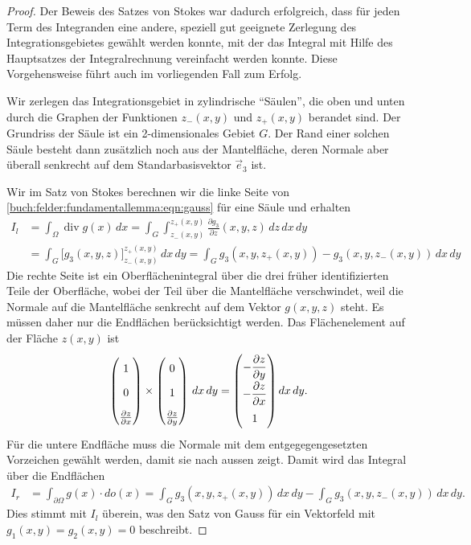 \begin{proof}
Der Beweis des Satzes von Stokes war dadurch erfolgreich, dass für jeden
Term des Integranden eine andere, speziell gut geeignete Zerlegung
des Integrationsgebietes gewählt werden konnte, mit der das Integral
mit Hilfe des Hauptsatzes der Integralrechnung vereinfacht werden konnte.
Diese Vorgehensweise führt auch im vorliegenden Fall zum Erfolg.

Wir zerlegen das Integrationsgebiet in zylindrische ``Säulen'', die
oben und unten durch die Graphen der Funktionen $z_-(x,y)$ und $z_+(x,y)$ 
berandet sind.
Der Grundriss der Säule ist ein 2-dimensionales Gebiet $G$.
Der Rand einer solchen Säule besteht dann zusätzlich noch aus der
Mantelfläche, deren Normale aber überall senkrecht auf dem Standarbasisvektor
$\vec{e}_3$ ist.

Wir im Satz von Stokes berechnen wir die linke Seite von
\eqref{buch:felder:fundamentallemma:eqn:gauss} für eine Säule und erhalten
\begin{align*}
I_l
&=
\int_\Omega \operatorname{div}g(x)\,dx
=
\int_{G}\int_{z_-(x,y)}^{z_+(x,y)}
\frac{\partial g_3}{\partial z}(x,y,z)
\,dz\,dx\,dy
\\
&=
\int_G \biggl[ g_3(x,y,z)\biggr]_{z_-(x,y)}^{z_+(x,y)}\,dx\,dy
=
\int_G g_3(x,y,z_+(x,y)) - g_3(x,y,z_-(x,y)) \,dx\,dy
\end{align*}
Die rechte Seite ist ein Oberflächenintegral über die drei früher
identifizierten Teile der Oberfläche, wobei der Teil über die Mantelfläche
verschwindet, weil die Normale auf die Mantelfläche senkrecht auf dem
Vektor $g(x,y,z)$ steht.
Es müssen daher nur die Endflächen berücksichtigt werden.
Das Flächenelement auf der Fläche $z(x,y)$ ist 
\[
\begin{pmatrix}
1\\
0\\
\frac{\partial z}{\partial x}
\end{pmatrix}
\times
\begin{pmatrix}
0\\
1\\
\frac{\partial z}{\partial y}
\end{pmatrix}
\,dx\,dy
=
{\renewcommand{\arraystretch}{1.8}
\begin{pmatrix}
\displaystyle
-\frac{\partial z}{\partial y}\\
\displaystyle
-\frac{\partial z}{\partial x}\\
1
\end{pmatrix}}
\,dx\,dy.
\]
Für die untere Endfläche muss die Normale mit dem entgegegengesetzten 
Vorzeichen gewählt werden, damit sie nach aussen zeigt.
Damit wird das Integral über die Endflächen
\begin{align*}
I_r
&=
\int_{\partial\Omega} g(x) \cdot do(x)
=
\int_{G} g_3(x,y,z_+(x,y)) \,dx\,dy
-
\int_{G} g_3(x,y,z_-(x,y)) \,dx\,dy.
\end{align*}
Dies stimmt mit $I_l$ überein, was den Satz von Gauss für ein
Vektorfeld mit $g_1(x,y)=g_2(x,y)=0$ beschreibt.


\end{proof}
